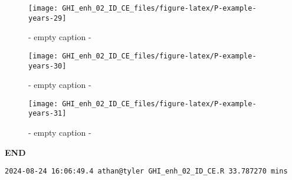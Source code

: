 \documentclass[
  10pt,
  a4paper,oneside]{article}
\begin{document}
\begin{figure}[H]

{\centering \texttt{[image: GHI\_enh\_02\_ID\_CE\_files/figure-latex/P-example-years-29]} 

}

\caption{ - empty caption - }\label{fig:P-example-years-29}
\end{figure}
\begin{figure}[H]

{\centering \texttt{[image: GHI\_enh\_02\_ID\_CE\_files/figure-latex/P-example-years-30]} 

}

\caption{ - empty caption - }\label{fig:P-example-years-30}
\end{figure}
\begin{figure}[H]

{\centering \texttt{[image: GHI\_enh\_02\_ID\_CE\_files/figure-latex/P-example-years-31]} 

}

\caption{ - empty caption - }\label{fig:P-example-years-31}
\end{figure}

\textbf{END}

\begin{verbatim}
2024-08-24 16:06:49.4 athan@tyler GHI_enh_02_ID_CE.R 33.787270 mins
\end{verbatim}
\end{document}
